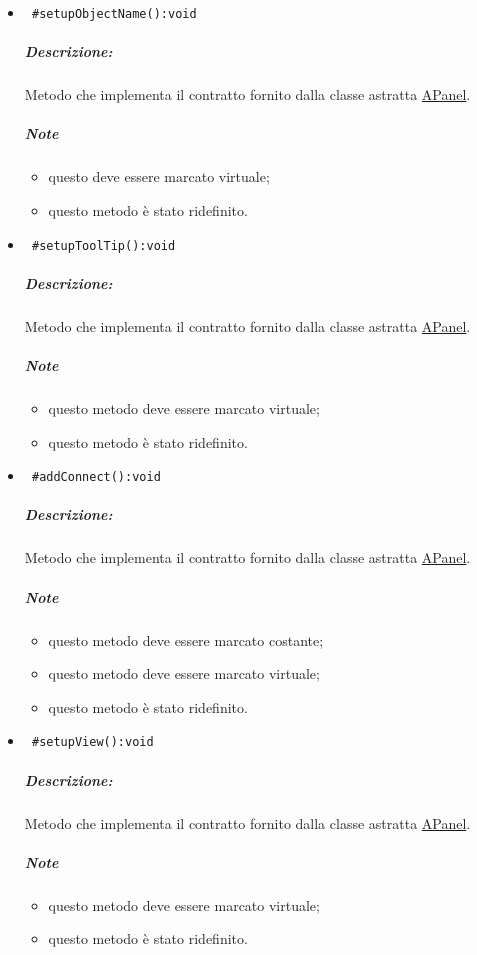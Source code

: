 \begin{itemize}
\item \color{blue}\verb! #setupObjectName():void!
\color{black}
\subparagraph{Descrizione: }
Metodo che implementa il contratto fornito dalla classe astratta \hyperref[speAPanel]{APanel}.\\
 \subparagraph{Note}
 \begin{itemize}
  \item questo deve essere marcato virtuale;
 \item questo metodo è stato ridefinito.
 \end{itemize}

\item \color{blue}\verb! #setupToolTip():void!
\color{black}
\subparagraph{Descrizione: }
Metodo che implementa il contratto fornito dalla classe astratta \hyperref[speAPanel]{APanel}.\\
 \subparagraph{Note}
 \begin{itemize}
 \item questo metodo deve essere marcato virtuale;
 \item questo metodo è stato ridefinito.
 \end{itemize}

\item \color{blue}\verb! #addConnect():void!
\color{black}
\subparagraph{Descrizione: }
Metodo che implementa il contratto fornito dalla classe astratta \hyperref[speAPanel]{APanel}.\\
 \subparagraph{Note}
 \begin{itemize}
 \item questo metodo deve essere marcato costante;
 \item questo metodo deve essere marcato virtuale;
 \item questo metodo è stato ridefinito.
 \end{itemize}
 
\item \color{blue}\verb! #setupView():void!
\color{black}
\subparagraph{Descrizione: }
Metodo che implementa il contratto fornito dalla classe astratta \hyperref[speAPanel]{APanel}.\\
 \subparagraph{Note}
 \begin{itemize}
 \item questo metodo deve essere marcato virtuale;
 \item questo metodo è stato ridefinito.
 \end{itemize}
 

\end{itemize}
